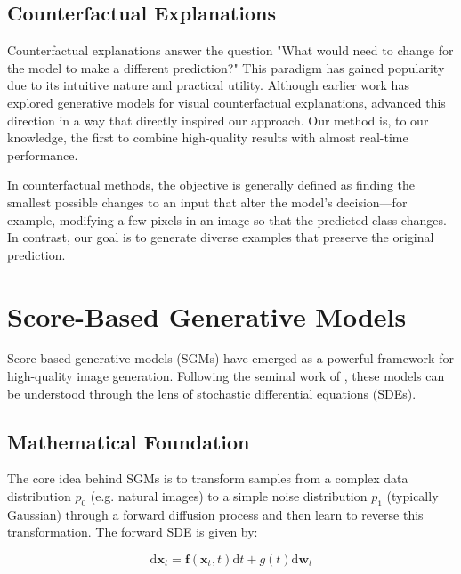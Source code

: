 \documentclass[licencjacka,en]{pracamgr}
\newcommand{\diff}{\mathrm{d}}
\begin{document}
\subsection{Counterfactual Explanations}

Counterfactual explanations answer the question "What would need to change for the model to make a different prediction?" This paradigm has gained popularity due to its intuitive nature and practical utility. Although earlier work has explored generative models for visual counterfactual explanations, \citep{sobieski2024rethinkingvisualcounterfactualexplanations} advanced this direction in a way that directly inspired our approach. Our method is, to our knowledge, the first to combine high-quality results with almost real-time performance.

In counterfactual methods, the objective is generally defined as finding the smallest possible changes to an input that alter the model’s decision—for example, modifying a few pixels in an image so that the predicted class changes. In contrast, our goal is to generate diverse examples that preserve the original prediction.

\section{Score-Based Generative Models}\label{sec:sgm_background}

Score-based generative models (SGMs) have emerged as a powerful framework for high-quality image generation. Following the seminal work of \citep{song2021scorebasedgenerativemodelingstochastic}, these models can be understood through the lens of stochastic differential equations (SDEs).

\subsection{Mathematical Foundation}

The core idea behind SGMs is to transform samples from a complex data distribution $p_0$ (e.g. natural images) to a simple noise distribution $p_1$ (typically Gaussian) through a forward diffusion process and then learn to reverse this transformation. The forward SDE is given by:

\begin{equation}
\diff \mathbf{x}_t = \mathbf{f}(\mathbf{x}_t, t) \diff t + g(t) \diff \mathbf{w}_t
\label{eq:forward_sde}
\end{equation}
\end{document}
